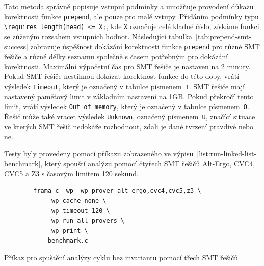 Tato metoda správně popisuje vstupní podmínky a umožňuje provodení důkazu korektnosti funkce \texttt{prepend},
ale pouze pro malé vstupy.
Přidáním podmínky typu \texttt{\textbackslash requires length(head) <= X;},
kde \texttt{X} označuje celé kladné číslo,
získáme funkci se zúženým rozsahem vstupních hodnot.
Následující tabulka~\ref{tab:prepend-smt-success} zobrazuje úspěšnost dokázání korektnosti funkce \texttt{prepend}
pro různé SMT řešiče a různé délky seznamu společně s časem potřebným pro dokázání korektnosti.
Maximální výpočetní čas pro SMT řešiče je nastaven na 2 minuty.
Pokud SMT řešiče nestihnou dokázat korektnost funkce do této doby,
vrátí výsledek \texttt{Timeout}, který je označený v tabulce písmenem~\texttt{T}.
SMT řešiče mají nastavený paměťový limit v základním nastavení na 1GB\@.
Pokud překročí tento limit, vrátí výsledek \texttt{Out of memory},
který je označený v tabulce písmenem~\texttt{O}.
Řešič může také vracet výsledek \texttt{Unknown}, označený písmenem~\texttt{U},
značící situace ve kterých SMT řešič nedokáže rozhodnout,
zdali je dané tvrzení pravdivé nebo ne.


Testy byly provedeny pomocí příkazu zobrazeného ve výpisu~\ref{list:run-linked-list-benchmark},
který spouští analýzu pomocí čtyřech SMT řešičů Alt-Ergo, CVC4, CVC5 a Z3 s časovým limitem 120 sekund.

\begin{listing}[H]
    \begin{verbatim}
        frama-c -wp -wp-prover alt-ergo,cvc4,cvc5,z3 \
            -wp-cache none \
            -wp-timeout 120 \
            -wp-run-all-provers \
            -wp-print \
            benchmark.c
    \end{verbatim}
    \caption{Příkaz pro spuštění analýzy cyklu bez invariantu pomocí třech SMT řešičů}
    \label{list:run-linked-list-benchmark}
\end{listing}


